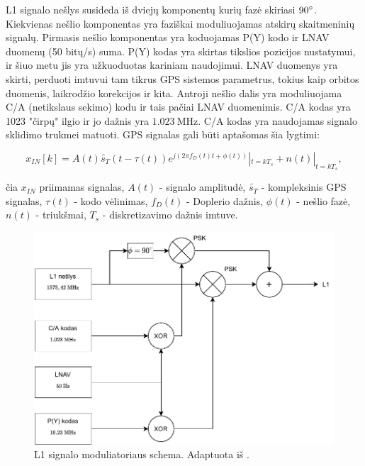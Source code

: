 \documentclass[main.tex]{subfiles}
\begin{document}
L1 signalo nešlys susideda iš dviejų komponentų kurių fazė skiriasi $90\degree$.
Kiekvienas nešlio komponentas yra faziškai moduliuojamas atskirų skaitmeninių signalų.
Pirmasis nešlio komponentas yra koduojamas P(Y) kodo ir LNAV duomenų (50 bitų/s) suma.
P(Y) kodas yra skirtas tikslios pozicijos nustatymui, ir šiuo metu jis yra užkuoduotas
kariniam naudojimui.
LNAV duomenys yra skirti, perduoti imtuvui tam tikrus GPS sistemos parametrus, tokius
kaip orbitos duomenis, laikrodžio korekcijos ir kita.
Antroji nešlio dalis yra moduliuojama C/A (netikslaus sekimo) kodu ir tais pačiai LNAV
duomenimis. C/A kodas yra 1023 "čirpų" ilgio ir jo dažnis yra $1.023\ \mathrm{MHz}$.
C/A kodas yra naudojamas signalo sklidimo trukmei matuoti. GPS signalas gali būti
aptašomas šia lygtimi:

\begin{equation}
    x_{IN}[k] = A(t) \widetilde{s_T}(t-\tau(t))e^{j(2\pi f_D(t)t+\phi(t))} |_{t=kT_s} + n(t) |_{t=kT_s},
    \label{eq:gps_signal}
\end{equation}

\noindent čia $x_{IN}$ priimamas signalas, $A(t)$ - signalo amplitudė, $\widetilde{s_T}$
- kompleksinis GPS signalas, $\tau(t)$ - kodo vėlinimas, $f_D(t)$ - Doplerio dažnis,
$\phi(t)$ - nešlio fazė, $n(t)$ - triukšmai, $T_s$ - diskretizavimo dažnis imtuve.

\begin{figure}[h]
    \begin{centering}
    \includegraphics[scale=0.85]{drawings/l1_signal}
    \par\end{centering}
    \protect\caption{\label{fig:l1_signal}L1 signalo moduliatoriaus schema. Adaptuota iš \cite{Sadeghi2008TimeSS}.}
\end{figure}
\end{document}
